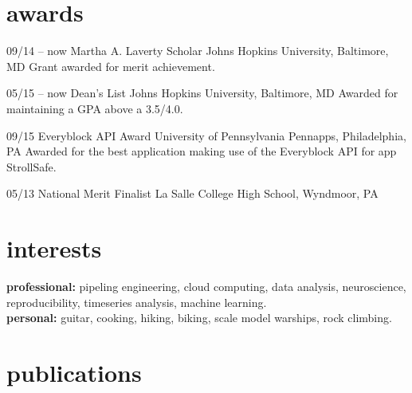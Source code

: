 \documentclass[]{friggeri-cv} %
\begin{document}

\section{awards}

\begin{entrylist}
\entry
{09/14 -- now}
{Martha A. Laverty Scholar}
{Johns Hopkins University, Baltimore, MD}
{Grant awarded for merit achievement.}

\entry
{05/15 -- now}
{Dean's List}
{Johns Hopkins University, Baltimore, MD}
{Awarded for maintaining a GPA above a 3.5/4.0.}


\entry
{09/15}
{Everyblock API Award}
{University of Pennsylvania Pennapps, Philadelphia, PA}
{Awarded for the best application making use of the Everyblock API for app StrollSafe.}

\entry
{05/13}
{National Merit Finalist}
{La Salle College High School, Wyndmoor, PA}
{}

\end{entrylist}


\newpage
\section{interests}

\textbf{professional:} pipeling engineering, cloud computing, data analysis, neuroscience, reproducibility, timeseries analysis, machine learning.\\
\textbf{personal:} guitar, cooking, hiking, biking, scale model warships, rock climbing.


\section{publications}





\end{document}
